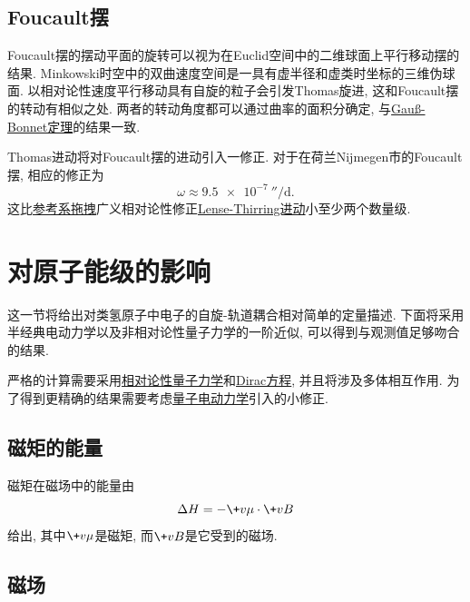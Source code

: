 \documentclass[hidelinks]{ctexart}
\begin{document}

\subsection{Foucault摆} %
\label{sub:foucault摆}

Foucault摆的摆动平面的旋转可以视为在Euclid空间中的二维球面上平行移动摆的结果. Minkowski时空中的双曲速度空间是一具有虚半径和虚类时坐标的三维伪球面. 以相对论性速度平行移动具有自旋的粒子会引发Thomas旋进, 这和Foucault摆的转动有相似之处. 两者的转动角度都可以通过曲率的面积分确定, 与\href{https://en.wikipedia.org/wiki/Gauss%E2%80%93Bonnet_theorem}{Gau\ss-Bonnet定理}的结果一致.
\par
Thomas进动将对Foucault摆的进动引入一修正. 对于在荷兰Nijmegen市的Foucault摆, 相应的修正为
\[ \omega \approx \SI{9.5e-7}{\arcsecond\per\day}. \]
这比\href{https://en.wikipedia.org/wiki/Frame-dragging}{参考系拖拽}广义相对论性修正\href{https://en.wikipedia.org/wiki/Lense%E2%80%93Thirring_precession}{Lense-Thirring进动}小至少两个数量级.



\section{对原子能级的影响} %
\label{sec:对原子能级的影响}

这一节将给出对类氢原子中电子的自旋-轨道耦合相对简单的定量描述. 下面将采用半经典电动力学以及非相对论性量子力学的一阶近似, 可以得到与观测值足够吻合的结果.
\par
严格的计算需要采用\href{https://en.wikipedia.org/wiki/Relativistic_quantum_mechanics}{相对论性量子力学}和\href{https://en.wikipedia.org/wiki/Dirac_equation}{Dirac方程}, 并且将涉及多体相互作用. 为了得到更精确的结果需要考虑\href{https://en.wikipedia.org/wiki/Quantum_electrodynamics}{量子电动力学}引入的小修正.

\subsection{磁矩的能量} %
\label{sub:磁矩的能量}

磁矩在磁场中的能量由
\[ \Delta H = -\+v\mu\cdot \+vB \]
给出, 其中$\+v\mu$是磁矩, 而$\+vB$是它受到的磁场.


\subsection{磁场} %
\label{sub:磁场}
\end{document}
